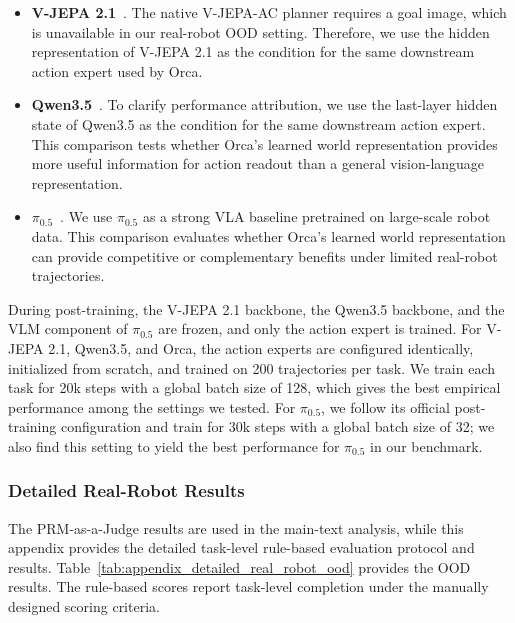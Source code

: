 \documentclass{llmxive}
\begin{document}
\vspace{-2ex}
\begin{itemize}
    \item \textbf{V-JEPA 2.1}~\citep{V-JEPA-2.1}. 
    The native V-JEPA-AC planner requires a goal image, which is unavailable in our real-robot OOD setting. 
    Therefore, we use the hidden representation of V-JEPA 2.1 as the condition for the same downstream action expert used by Orca.

    \item \textbf{Qwen3.5}~\citep{qwen35}. 
    To clarify performance attribution, we use the last-layer hidden state of Qwen3.5 as the condition for the same downstream action expert. 
    This comparison tests whether Orca's learned world representation provides more useful information for action readout than a general vision-language representation.

    \item \textbf{$\pi_{0.5}$}~\citep{pi0.5}. 
    We use $\pi_{0.5}$ as a strong VLA baseline pretrained on large-scale robot data. 
    This comparison evaluates whether Orca's learned world representation can provide competitive or complementary benefits under limited real-robot trajectories.
\end{itemize}

During post-training, the V-JEPA 2.1 backbone, the Qwen3.5 backbone, and the VLM component of $\pi_{0.5}$ are frozen, and only the action expert is trained. 
For V-JEPA 2.1, Qwen3.5, and Orca, the action experts are configured identically, initialized from scratch, and trained on 200 trajectories per task. 
We train each task for 20k steps with a global batch size of 128, which gives the best empirical performance among the settings we tested. 
For $\pi_{0.5}$, we follow its official post-training configuration and train for 30k steps with a global batch size of 32; we also find this setting to yield the best performance for $\pi_{0.5}$ in our benchmark.




\subsubsection{Detailed Real-Robot Results}
\label{sec:appendix_evaluation_toA_results}
The PRM-as-a-Judge results are used in the main-text analysis, while this appendix provides the detailed task-level rule-based evaluation protocol and results. 
Table~\ref{tab:appendix_detailed_real_robot_ood} provides the OOD results. 
The rule-based scores report task-level completion under the manually designed scoring criteria. 
\end{document}
